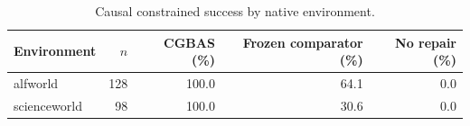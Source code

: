 \begin{table}[t]
\centering
\small
\caption{Causal constrained success by native environment.}
\begin{tabular}{lrrrr}
\toprule
Environment & $n$ & CGBAS (\%) & Frozen comparator (\%) & No repair (\%) \\
\midrule
alfworld & 128 & 100.0 & 64.1 & 0.0 \\
scienceworld & 98 & 100.0 & 30.6 & 0.0 \\
\bottomrule
\end{tabular}
\end{table}
